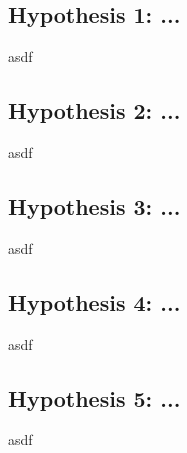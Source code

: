 \subsection{Hypothesis 1: ...}
\label{subsec:Evaluation:Study2:Hypothesis1}
asdf

\subsection{Hypothesis 2: ...}
\label{subsec:Evaluation:Study2:Hypothesis2}
asdf

\subsection{Hypothesis 3: ...}
\label{subsec:Evaluation:Study2:Hypothesis3}
asdf

\subsection{Hypothesis 4: ...}
\label{subsec:Evaluation:Study2:Hypothesis4}
asdf

\subsection{Hypothesis 5: ...}
\label{subsec:Evaluation:Study2:Hypothesis5}
asdf